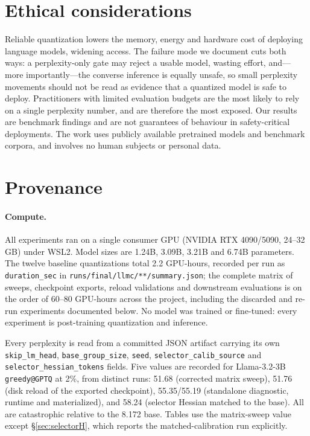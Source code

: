 \documentclass[11pt]{article}
\begin{document}
\section*{Ethical considerations}

Reliable quantization lowers the memory, energy and hardware cost of deploying language models,
widening access. The failure mode we document cuts both ways: a perplexity-only gate may reject
a usable model, wasting effort, and---more importantly---the converse inference is equally
unsafe, so small perplexity movements should not be read as evidence that a quantized model is
safe to deploy. Practitioners with limited evaluation budgets are the most likely to rely on a
single perplexity number, and are therefore the most exposed. Our results are benchmark findings
and are not guarantees of behaviour in safety-critical deployments. The work uses publicly
available pretrained models and benchmark corpora, and involves no human subjects or personal
data.




\appendix

\section{Provenance}
\label{app:provenance}

\paragraph{Compute.} All experiments ran on a single consumer GPU (NVIDIA RTX 4090/5090, 24--32\,GB)
under WSL2. Model sizes are 1.24B, 3.09B, 3.21B and 6.74B parameters. The twelve baseline
quantizations total 2.2 GPU-hours, recorded per run as \texttt{duration\_sec} in
\texttt{runs/final/llmc/**/summary.json}; the complete matrix of sweeps, checkpoint exports,
reload validations and downstream evaluations is on the order of 60--80 GPU-hours across the
project, including the discarded and re-run experiments documented below. No model was trained or
fine-tuned: every experiment is post-training quantization and inference.

Every perplexity is read from a committed JSON artifact carrying its own \texttt{skip\_lm\_head},
\texttt{base\_group\_size}, \texttt{seed}, \texttt{selector\_calib\_source} and
\texttt{selector\_hessian\_tokens} fields. Five values are recorded for Llama-3.2-3B
\texttt{greedy@GPTQ} at 2\%, from distinct runs: 51.68 (corrected matrix sweep), 51.76 (disk
reload of the exported checkpoint), 55.35/55.19 (standalone diagnostic, runtime and
materialized), and 58.24 (selector Hessian matched to the base). All are catastrophic relative to
the 8.172 base. Tables use the matrix-sweep value except \S\ref{sec:selectorH}, which reports the
matched-calibration run explicitly.
\end{document}
